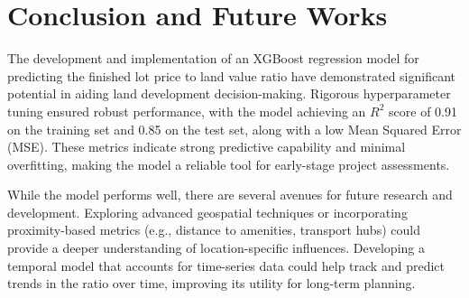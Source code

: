 \section{Conclusion and Future Works}

The development and implementation of an XGBoost regression model for predicting
the finished lot price to land value ratio have demonstrated significant potential
in aiding land development decision-making. Rigorous hyperparameter tuning
ensured robust performance, with the model achieving an $R^{2}$ score of 0.91 on
the training set and 0.85 on the test set, along with a low Mean Squared Error (MSE).
These metrics indicate strong predictive capability and minimal overfitting,
making the model a reliable tool for early-stage project assessments.

While the model performs well, there are several avenues for future research and
development. Exploring advanced geospatial techniques or incorporating proximity-based
metrics (e.g., distance to amenities, transport hubs) could provide a deeper understanding
of location-specific influences. Developing a temporal model that accounts for
time-series data could help track and predict trends in the ratio over time, improving
its utility for long-term planning.